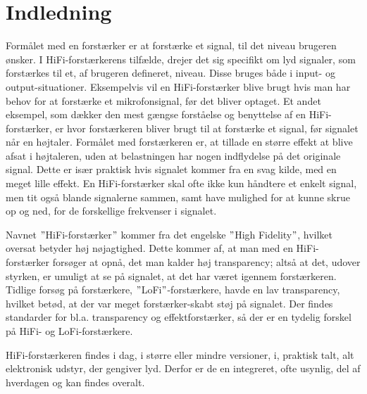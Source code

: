 \chapter{Indledning}
\label{indledning}
Formålet med en forstærker er at forstærke et signal, til det niveau brugeren ønsker. I HiFi-forstærkerens tilfælde, drejer det sig specifikt om lyd signaler, som forstærkes til et, af brugeren defineret, niveau. Disse bruges både i input- og output-situationer. Eksempelvis vil en HiFi-forstærker blive brugt hvis man har behov for at forstærke et mikrofonsignal, før det bliver optaget. Et andet eksempel, som dækker den mest gængse forståelse og benyttelse af en HiFi-forstærker, er hvor forstærkeren bliver brugt til at forstærke et signal, før signalet når en højtaler. Formålet med forstærkeren er, at tillade en større effekt at blive afsat i højtaleren, uden at belastningen har nogen indflydelse på det originale signal. Dette er især praktisk hvis signalet kommer fra en svag kilde, med en meget lille effekt. En HiFi-forstærker skal ofte ikke kun håndtere et enkelt signal, men tit også blande signalerne sammen, samt have mulighed for at kunne skrue op og ned, for de forskellige frekvenser i signalet. 

Navnet $"$HiFi-forstærker$"$ kommer fra det engelske $"$High Fidelity$"$, hvilket oversat betyder høj nøjagtighed. Dette kommer af, at man med en HiFi-forstærker forsøger at opnå, det man kalder høj transparency; altså at det, udover styrken, er umuligt at se på signalet, at det har været igennem forstærkeren. Tidlige forsøg på forstærkere, $"$LoFi$"$-forstærkere, havde en lav transparency, hvilket betød, at der var meget forstærker-skabt støj på signalet. Der findes standarder for bl.a. transparency og effektforstærker, så der er en tydelig forskel på HiFi- og LoFi-forstærkere.

HiFi-forstærkeren findes i dag, i større eller mindre versioner, i, praktisk talt, alt elektronisk udstyr, der gengiver lyd. Derfor er de en integreret, ofte usynlig, del af hverdagen og kan findes overalt.